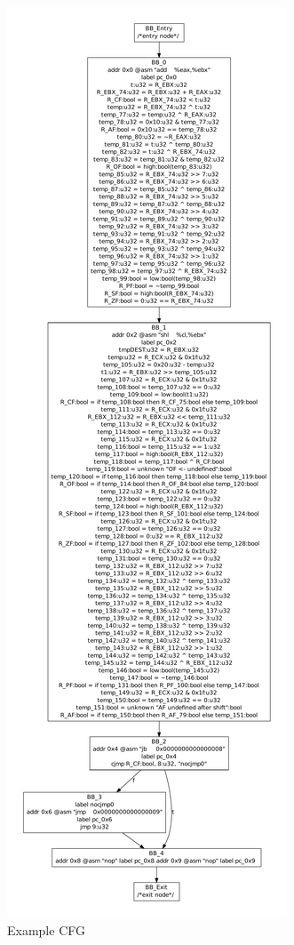 \begin{figure}
  \begin{center}
    \includegraphics[height=.9\textheight]{chap-examples/cfg.pdf}
  \end{center}
  \caption{Example CFG}
  \label{fig:cfg}
\end{figure}

